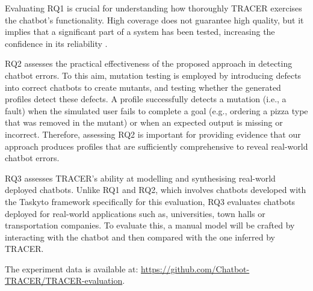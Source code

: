 Evaluating RQ1 is crucial for understanding
how thoroughly \ac{TRACER} exercises the chatbot’s functionality.
High coverage does not guarantee high quality,
but it implies that a significant part of a system has been tested,
increasing the confidence in its reliability
\autocite{ammannIntroductionSoftwareTesting2017}.


RQ2 assesses the practical effectiveness
of the proposed approach in detecting chatbot errors.
To this aim, mutation testing is employed
\autocite{demilloHintsTestData1978}
by introducing defects into correct chatbots to create mutants,
and testing whether the generated profiles detect these defects.
A profile successfully detects a mutation (i.e., a fault)
when the simulated user fails to complete a goal
(e.g., ordering a pizza type that was removed in the mutant)
or when an expected output is missing or incorrect.
Therefore, assessing RQ2 is important
for providing evidence that our approach produces
profiles that are sufficiently comprehensive
to reveal real-world chatbot errors.

RQ3 assesses \ac{TRACER}'s ability at modelling and synthesising
real-world deployed chatbots.
Unlike RQ1 and RQ2, which involves chatbots developed with the Taskyto framework
specifically for this evaluation,
RQ3 evaluates chatbots deployed for real-world applications
such as, universities, town halls or transportation companies.
To evaluate this, a manual model will be crafted
by interacting with the chatbot
and then compared with the one inferred by \ac{TRACER}.

The experiment data is available at:
\url{https://github.com/Chatbot-TRACER/TRACER-evaluation}.




